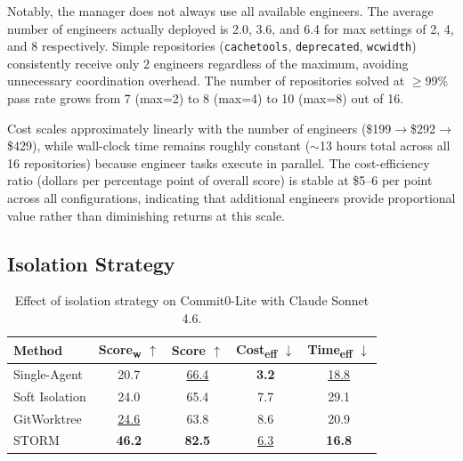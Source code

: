 \documentclass{article}
\begin{document}
Notably, the manager does not always use all available engineers. The average number of engineers actually deployed is 2.0, 3.6, and 6.4 for max settings of 2, 4, and 8 respectively. Simple repositories (\texttt{cachetools}, \texttt{deprecated}, \texttt{wcwidth}) consistently receive only 2 engineers regardless of the maximum, avoiding unnecessary coordination overhead. The number of repositories solved at $\geq$99\% pass rate grows from 7 (max=2) to 8 (max=4) to 10 (max=8) out of 16.

Cost scales approximately linearly with the number of engineers (\$199$\to$\$292$\to$\$429), while wall-clock time remains roughly constant ($\sim$13 hours total across all 16 repositories) because engineer tasks execute in parallel. The cost-efficiency ratio (dollars per percentage point of overall score) is stable at \$5--6 per point across all configurations, indicating that additional engineers provide proportional value rather than diminishing returns at this scale.



\subsection{Isolation Strategy}

\begin{table}[h]
  \caption{Effect of isolation strategy on Commit0-Lite with Claude Sonnet 4.6.}
  \label{tab:isolation-ablation}
  \centering
  \small
  \begin{tabular}{l cc cc}
    \toprule
Method & Score\textsubscript{w} $\uparrow$ & Score $\uparrow$ & Cost\textsubscript{eff} $\downarrow$ & Time\textsubscript{eff} $\downarrow$ \\
    \midrule
    Single-Agent           & 20.7 & \underline{66.4} & \textbf{3.2} & \underline{18.8} \\
    Soft Isolation         & 24.0 & 65.4 & 7.7 & 29.1 \\
    GitWorktree            & \underline{24.6} & 63.8 & 8.6 & 20.9 \\
    STORM                  & \textbf{46.2} & \textbf{82.5} & \underline{6.3} & \textbf{16.8} \\
    \bottomrule
  \end{tabular}
\end{table}
\end{document}
